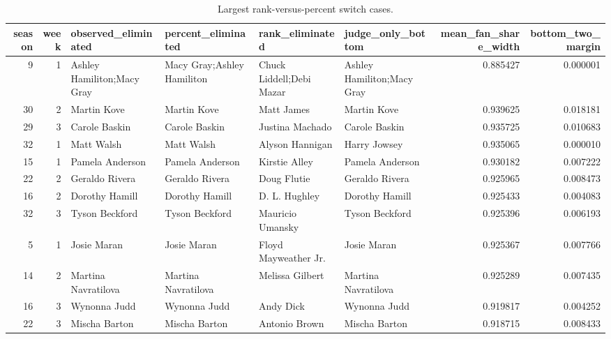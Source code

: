 \begin{table}
\caption{Largest rank-versus-percent switch cases.}
\begin{tabular}{rrllllrr}
\toprule
season & week & observed\_eliminated & percent\_eliminated & rank\_eliminated & judge\_only\_bottom & mean\_fan\_share\_width & bottom\_two\_margin \\
\midrule
9 & 1 & Ashley Hamiliton;Macy Gray & Macy Gray;Ashley Hamiliton & Chuck Liddell;Debi Mazar & Ashley Hamiliton;Macy Gray & 0.885427 & 0.000001 \\
30 & 2 & Martin Kove & Martin Kove & Matt James & Martin Kove & 0.939625 & 0.018181 \\
29 & 3 & Carole Baskin & Carole Baskin & Justina Machado & Carole Baskin & 0.935725 & 0.010683 \\
32 & 1 & Matt Walsh & Matt Walsh & Alyson Hannigan & Harry Jowsey & 0.935065 & 0.000010 \\
15 & 1 & Pamela Anderson & Pamela Anderson & Kirstie Alley & Pamela Anderson & 0.930182 & 0.007222 \\
22 & 2 & Geraldo Rivera & Geraldo Rivera & Doug Flutie & Geraldo Rivera & 0.925965 & 0.008473 \\
16 & 2 & Dorothy Hamill & Dorothy Hamill & D. L. Hughley & Dorothy Hamill & 0.925433 & 0.004083 \\
32 & 3 & Tyson Beckford & Tyson Beckford & Mauricio Umansky & Tyson Beckford & 0.925396 & 0.006193 \\
5 & 1 & Josie Maran & Josie Maran & Floyd Mayweather Jr.  & Josie Maran & 0.925367 & 0.007766 \\
14 & 2 & Martina Navratilova & Martina Navratilova & Melissa Gilbert & Martina Navratilova & 0.925289 & 0.007435 \\
16 & 3 & Wynonna Judd & Wynonna Judd & Andy Dick & Wynonna Judd & 0.919817 & 0.004252 \\
22 & 3 & Mischa Barton & Mischa Barton & Antonio Brown & Mischa Barton & 0.918715 & 0.008433 \\
\bottomrule
\end{tabular}
\end{table}

